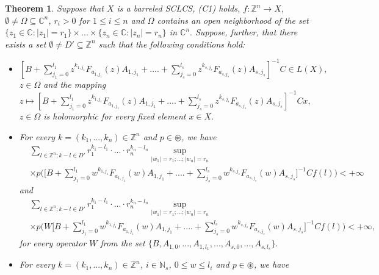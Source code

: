 \documentclass{amsart}
\newtheorem{thm}{Theorem}[section]
\theoremstyle{definition}
\theoremstyle{remark}
\numberwithin{equation}{section}
\begin{document}
\begin{thm}\label{movesvolt}
Suppose that $X$ is a barreled \emph{SCLCS}, \emph{(C1)} holds, $f: {\mathbb Z}^{n} \rightarrow X$, $\emptyset \neq \Omega \subseteq {\mathbb C}^{n}$, $r_{i}>0$ for $1\leq i\leq n$ and $\Omega$ contains an open neighborhood of the set $\{z_{1}\in {\mathbb C} : |z_{1}|=r_{1}\} \times ... \times \{z_{n}\in {\mathbb C} : |z_{n}|=r_{n}\}$ in ${\mathbb C}^{n}.$ 
Suppose, further, that there exists a set $\emptyset \neq D' \subseteq {\mathbb Z}^{n}$ such that the following conditions hold:
\begin{itemize}
\item[(i)] $[B +\sum_{j_{1}=0}^{l_{1}}z^{k_{1,j_{1}}}F_{a_{1,j_{1}}}(z)A_{1,j_{1}} 
+....+\sum_{j_{s}=0}^{l_{s}}z^{k_{s,j_{s}}}F_{a_{s,j_{s}}}(z)A_{s,j_{s}}]^{-1}C\in L(X),$ $z\in \Omega$ and the mapping\\ $z\mapsto [B +\sum_{j_{1}=0}^{l_{1}}z^{k_{1,j_{1}}}F_{a_{1,j_{1}}}(z)A_{1,j_{1}} 
+....+\sum_{j_{s}=0}^{l_{s}}z^{k_{s,j_{s}}}F_{a_{s,j_{s}}}(z)A_{s,j_{s}}]^{-1}Cx,$ $z\in \Omega$ is holomorphic for every fixed element $x\in X.$
\item[(ii)] For every $k=(k_{1},...,k_{n})\in {\mathbb Z}^{n}$ and $p\in \circledast $, we have{\scriptsize
\begin{align*} & 
\sum_{l\in {\mathbb Z}^{n}; k-l\in D'}r_{1}^{k_{1}-l_{1}}\cdot ... \cdot r_{n}^{k_{n}-l_{n}}\sup_{|w_{1}|=r_{1};...;|w_{n}|=r_{n}} \\  &  \times  p\Biggl( \Biggl[B +\sum_{j_{1}=0}^{l_{1}}w^{k_{1,j_{1}}}F_{a_{1,j_{1}}}(w)A_{1,j_{1}} 
+....+\sum_{j_{s}=0}^{l_{s}}w^{k_{s,j_{s}}}F_{a_{s,j_{s}}}(w)A_{s,j_{s}}\Biggr]^{-1}Cf(l)\Biggr) <+\infty
\end{align*}}and{\scriptsize
\begin{align*} & 
\sum_{l\in {\mathbb Z}^{n}; k-l\in D'}r_{1}^{k_{1}-l_{1}}\cdot ... \cdot r_{n}^{k_{n}-l_{n}}\sup_{|w_{1}|=r_{1};...;|w_{n}|=r_{n}}
\\ & \times  p\Biggl(W\Biggl[B +\sum_{j_{1}=0}^{l_{1}}w^{k_{1,j_{1}}}F_{a_{1,j_{1}}}(w)A_{1,j_{1}} 
+....+\sum_{j_{s}=0}^{l_{s}}w^{k_{s,j_{s}}}F_{a_{s,j_{s}}}(w)A_{s,j_{s}}\Biggr]^{-1}Cf(l)\Biggr)<+\infty ,
\end{align*}}for every operator $W$ from the set $\{B,A_{1,0},...,A_{1,l_{1}},..., A_{s,0},...,A_{s,l_{s}}\}.$
\item[(iii)] For every $k=(k_{1},...,k_{n})\in {\mathbb Z}^{n}$, $ i\in {\mathbb N}_{s}$, $0\leq w\leq l_{i}$ and $p\in \circledast $, we have{\scriptsize
\begin{align*} & 

\end{align*}}
\end{itemize}
\end{thm}
\end{document}

